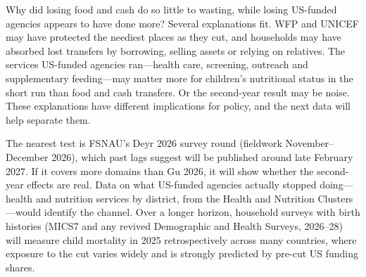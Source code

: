 \documentclass[11pt]{article}
\newcommand{\hd}[1]{\par\bigskip{\sffamily\large\bfseries\color{navy}#1}\par\smallskip}
\begin{document}
Why did losing food and cash do so little to wasting, while losing US-funded agencies appears to have done more? Several explanations fit. WFP and UNICEF may have protected the neediest places as they cut, and households may have absorbed lost transfers by borrowing, selling assets or relying on relatives. The services US-funded agencies ran---health care, screening, outreach and supplementary feeding---may matter more for children's nutritional status in the short run than food and cash transfers. Or the second-year result may be noise. These explanations have different implications for policy, and the next data will help separate them.

\hd{7. What would settle it}

The nearest test is FSNAU's Deyr 2026 survey round (fieldwork November--December 2026), which past lags suggest will be published around late February 2027. If it covers more domains than Gu 2026, it will show whether the second-year effects are real. Data on what US-funded agencies actually stopped doing---health and nutrition services by district, from the Health and Nutrition Clusters---would identify the channel. Over a longer horizon, household surveys with birth histories (MICS7 and any revived Demographic and Health Surveys, 2026--28) will measure child mortality in 2025 retrospectively across many countries, where exposure to the cut varies widely and is strongly predicted by pre-cut US funding shares.
\end{document}

